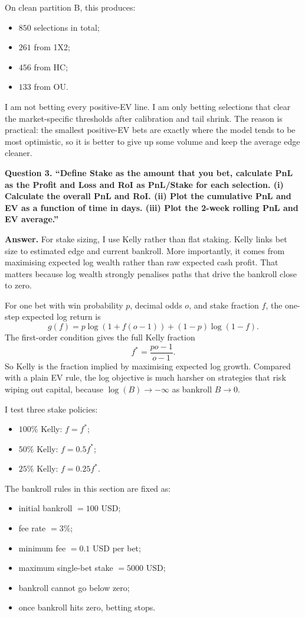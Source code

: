 \documentclass{article}
\begin{document}
On clean partition B, this produces:
\begin{itemize}
    \item \(850\) selections in total;
    \item \(261\) from 1X2;
    \item \(456\) from HC;
    \item \(133\) from OU.
\end{itemize}

I am not betting every positive-EV line. I am only betting selections that clear the market-specific thresholds after calibration and tail shrink. The reason is practical: the smallest positive-EV bets are exactly where the model tends to be most optimistic, so it is better to give up some volume and keep the average edge cleaner.

\bigskip

\noindent \textbf{Question 3. ``Define Stake as the amount that you bet, calculate PnL as the Profit and Loss and RoI as PnL/Stake for each selection. (i) Calculate the overall PnL and RoI. (ii) Plot the cumulative PnL and EV as a function of time in days. (iii) Plot the 2-week rolling PnL and EV average.''}

\noindent \textbf{Answer.} For stake sizing, I use Kelly rather than flat staking. Kelly links bet size to estimated edge and current bankroll. More importantly, it comes from maximising expected log wealth rather than raw expected cash profit. That matters because log wealth strongly penalises paths that drive the bankroll close to zero.

For one bet with win probability \(p\), decimal odds \(o\), and stake fraction \(f\), the one-step expected log return is
\[
g(f)=p\log \left(1+f(o-1)\right)+(1-p)\log(1-f).
\]
The first-order condition gives the full Kelly fraction
\[
f^{*}=\frac{po-1}{o-1}.
\]
So Kelly is the fraction implied by maximising expected log growth. Compared with a plain EV rule, the log objective is much harsher on strategies that risk wiping out capital, because \(\log(B)\to -\infty\) as bankroll \(B\to 0\).

I test three stake policies:
\begin{itemize}
    \item \(100\%\) Kelly: \(f=f^{*}\);
    \item \(50\%\) Kelly: \(f=0.5f^{*}\);
    \item \(25\%\) Kelly: \(f=0.25f^{*}\).
\end{itemize}

The bankroll rules in this section are fixed as:
\begin{itemize}
    \item initial bankroll \(=100\) USD;
    \item fee rate \(=3\%\);
    \item minimum fee \(=0.1\) USD per bet;
    \item maximum single-bet stake \(=5000\) USD;
    \item bankroll cannot go below zero;
    \item once bankroll hits zero, betting stops.
\end{itemize}
\end{document}
